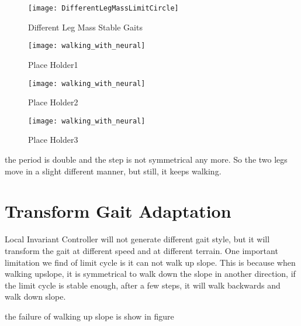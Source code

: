 \begin{figure}[!htbp]
  \begin{center}
      \texttt{[image: DifferentLegMassLimitCircle]}
    \caption{Different Leg Mass Stable Gaits}
    \label{fig:differentlr}
\end{center}
\end{figure}


\begin{figure}[!htbp]
  \begin{center}
      \texttt{[image: walking\_with\_neural]}
    \caption{Place Holder1}
    \label{fig:lm1}
\end{center}
\end{figure}

\begin{figure}[!htbp]
  \begin{center}
      \texttt{[image: walking\_with\_neural]}
    \caption{Place Holder2}
    \label{fig:lm2}
\end{center}
\end{figure}

\begin{figure}[!htbp]
  \begin{center}
      \texttt{[image: walking\_with\_neural]}
    \caption{Place Holder3}
    \label{fig:lm3}
\end{center}
\end{figure}





the period is double and the step is not symmetrical any more. So the two legs move in a slight different manner, but still, it keeps walking.

\section{Transform Gait Adaptation}
Local Invariant Controller will not generate different gait style, but it will transform the gait at different speed and at different terrain.
One important limitation we find of limit cycle is it can not walk up slope.
This is because when walking upslope, it is symmetrical to walk down the slope in another direction, if the limit cycle is stable enough, after a few steps, it will walk backwards and walk down slope.


the failure of walking up slope is show in figure

